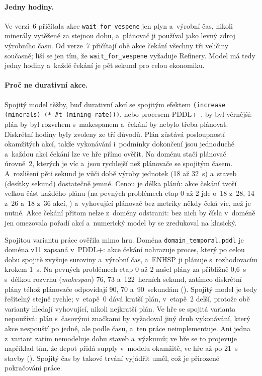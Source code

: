 \paragraph{Jedny hodiny.} Ve verzi~6 přičítala akce \texttt{wait\_for\_vespene} jen plyn a~výrobní čas, nikoli minerály vytěžené za stejnou dobu, a~plánovač ji používal jako levný zdroj výrobního času. Od verze~7 přičítají obě akce čekání všechny tři veličiny současně; liší se jen tím, že \texttt{wait\_for\_vespene} vyžaduje Refinery. Model má tedy jedny hodiny a~každé čekání je pět sekund pro celou ekonomiku.

\paragraph{Proč ne durativní akce.} Spojitý model těžby, buď durativní akcí se spojitým efektem \texttt{(increase (minerals) (* \#t (mining-rate)))}, nebo procesem PDDL+~\cite{FoxLong2006}, by byl věrnější: plán by byl rozvrhem s~makespanem a~čekání by nebylo třeba plánovat. Diskrétní hodiny byly zvoleny ze tří důvodů. Plán zůstává posloupností okamžitých akcí, takže vykonávání i~podmínky dokončení jsou jednoduché a~každou akci čekání lze ve hře přímo ověřit. Na doménu stačí plánovač úrovně~2, kterých je víc a~jsou rychlejší než plánovače se spojitým časem. A~rozlišení pěti sekund je vůči době výroby jednotek (18 až 32~s) a~staveb (desítky sekund) dostatečně jemné. Cenou je délka plánů: akce čekání tvoří velkou část každého plánu (na pevných problémech etap 0 až 2 jde o~18 z~28, 14 z~26 a~18 z~36 akcí, ) a~vyhovující plánovač bez metriky někdy čeká víc, než je nutné. Akce čekání přitom nelze z~domény odstranit: bez nich by čísla v~doméně jen omezovala pořadí akcí a~numerický model by se zredukoval na klasický.

Spojitou variantu práce ověřila mimo hru. Doména \texttt{domain\_temporal.pddl} je doména v11 zapsaná v~PDDL+: akce čekání nahrazuje proces, který po celou dobu spojitě zvyšuje suroviny a~výrobní čas, a~ENHSP ji plánuje s~rozhodovacím krokem 1~s. Na pevných problémech etap 0 až 2 našel plány za přibližně 0,6~s s~délkou rozvrhu (\emph{makespan}) 76, 73 a~122~herních sekund, zatímco diskrétní plány téhož plánovače odpovídají 90, 70 a~90~sekundám (). Spojitý model je tedy řešitelný stejně rychle; v~etapě~0 dává kratší plán, v~etapě~2 delší, protože obě varianty hledají vyhovující, nikoli nejkratší plán. Ve hře se spojitá varianta nepoužívá: plán s~časovými značkami by vyžadoval jiný druh vykonávání, který akce nespouští po jedné, ale podle času, a~ten práce neimplementuje. Ani jedna z~variant zatím nemodeluje dobu staveb a~výzkumů; ve hře se to projevuje například tím, že depot přidá supply v~modelu okamžitě, ve hře až po 21~s stavby (). Spojitý čas by takové trvání vyjádřit uměl, což je přirozené pokračování práce.

